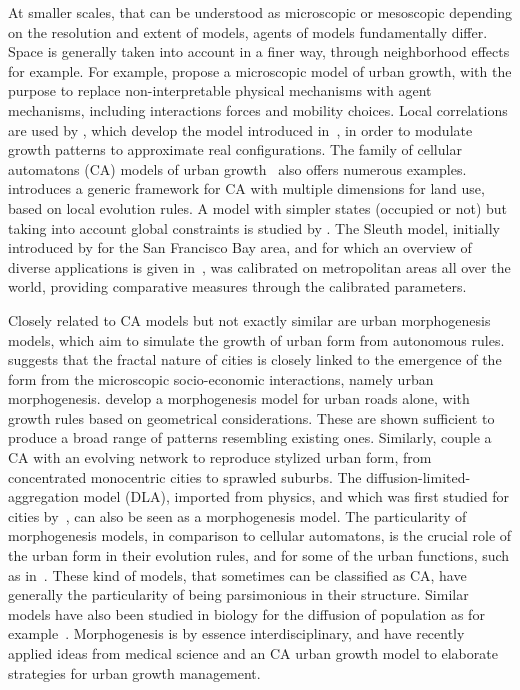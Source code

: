 \documentclass[10pt,letterpaper]{article}
\begin{document}
At smaller scales, that can be understood as microscopic or mesoscopic depending on the resolution and extent of models, agents of models fundamentally differ. Space is generally taken into account in a finer way, through neighborhood effects for example. For example, \cite{andersson2002urban} propose a microscopic model of urban growth, with the purpose to replace non-interpretable physical mechanisms with agent mechanisms, including interactions forces and mobility choices. Local correlations are used by \cite{makse1998modeling}, which develop the model introduced in~\cite{makse1995modelling}, in order to modulate growth patterns to approximate real configurations. The family of cellular automatons (CA) models of urban growth~\cite{batty1994cells} also offers numerous examples. \cite{GEAN:GEAN940} introduces a generic framework for CA with multiple dimensions for land use, based on local evolution rules. A model with simpler states (occupied or not) but taking into account global constraints is studied by \cite{ward2000stochastically}. The Sleuth model, initially introduced by \cite{clarke1998loose} for the San Francisco Bay area, and for which an overview of diverse applications is given in~\cite{clarke2007decade}, was calibrated on metropolitan areas all over the world, providing comparative measures through the calibrated parameters.


Closely related to CA models but not exactly similar are urban morphogenesis models, which aim to simulate the growth of urban form from autonomous rules. \cite{frankhauser1998fractal} suggests that the fractal nature of cities is closely linked to the emergence of the form from the microscopic socio-economic interactions, namely urban morphogenesis. \cite{courtat2011mathematics} develop a morphogenesis model for urban roads alone, with growth rules based on geometrical considerations. These are shown sufficient to produce a broad range of patterns resembling existing ones. Similarly, \cite{raimbault2014hybrid} couple a CA with an evolving network to reproduce stylized urban form, from concentrated monocentric cities to sprawled suburbs. The diffusion-limited-aggregation model (DLA), imported from physics, and which was first studied for cities by~\cite{batty1991generating}, can also be seen as a morphogenesis model. The particularity of morphogenesis models, in comparison to cellular automatons, is the crucial role of the urban form in their evolution rules, and for some of the urban functions, such as in~\cite{bonin2012modele}. These kind of models, that sometimes can be classified as CA, have generally the particularity of being parsimonious in their structure. Similar models have also been studied in biology for the diffusion of population as for example~\cite{bosch1990velocity}. Morphogenesis is by essence interdisciplinary, and \cite{sakieh2016treating} have recently applied ideas from medical science and an CA urban growth model to elaborate strategies for urban growth management.
\end{document}
